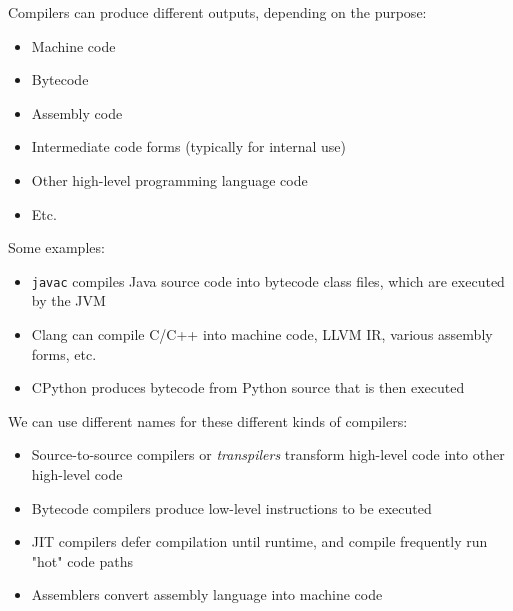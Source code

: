 \documentclass[../index.tex]{subfiles}
\begin{document}
\begin{frame}[fragile]{\currenttitle}
  Compilers can produce different outputs, depending on the purpose:

  \begin{itemize}
    \item<+-> Machine code
    \item<+-> Bytecode
    \item<+-> Assembly code
    \item<+-> Intermediate code forms (typically for internal use)
    \item<+-> Other high-level programming language code
    \item<+-> Etc.
  \end{itemize}
\end{frame}

\begin{frame}[fragile]{\currenttitle}
  Some examples:

  \begin{itemize}
    \item<+-> \texttt{javac} compiles Java source code into bytecode class
      files, which are executed by the JVM
    \item<+-> Clang can compile C/C++ into machine code, LLVM IR,
      various assembly forms, etc.
    \item<+-> CPython produces bytecode from Python source that is then
      executed
  \end{itemize}
\end{frame}

\begin{frame}[fragile]{\currenttitle}
  We can use different names for these different kinds of compilers:

  \begin{itemize}
    \item<+-> Source-to-source compilers or \textit{transpilers} transform
      high-level code into other high-level code
    \item<+-> Bytecode compilers produce low-level instructions to be executed
    \item<+-> JIT compilers defer compilation until runtime, and compile
      frequently run "hot" code paths
    \item<+-> Assemblers convert assembly language into machine code
  \end{itemize}
\end{frame}

\end{document}
